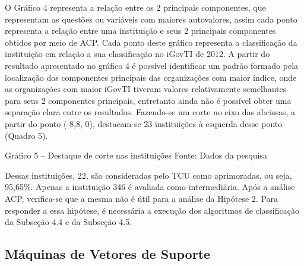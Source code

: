 O Gráfico 4 representa a relação entre os 2 principais componentes, que representam as questões ou variáveis com maiores autovalores, assim cada ponto representa a relação entre uma instituição e seus 2 principais componentes obtidos por meio de ACP. Cada ponto deste gráfico representa a classificação da instituição em relação a sua classificação no iGovTI de 2012. A partir do resultado apresentado no gráfico 4 é possível identificar um padrão formado pela localização dos componentes principais das organizações com maior índice, onde as organizações com maior iGovTI tiveram valores relativamente semelhantes para seus 2 componentes principais, entretanto ainda não é possível obter uma separação clara entre os resultados. Fazendo-se um corte no eixo das abcissas, a partir do ponto (-8,8, 0), destacam-se 23 instituições à esquerda desse ponto (Quadro 5). 

Gráfico 5 – Destaque de corte nas instituições 
Fonte: Dados da pesquisa

Dessas instituições, 22, são consideradas pelo TCU como aprimoradas, ou seja, 95,65\%. Apenas a instituição 346 é avaliada como intermediária.
Após a análise ACP, verifica-se que a mesma não é útil para a análise da Hipótese 2. Para responder a essa hipótese, é necessária a execução dos algoritmos de classificação da Subseção 4.4 e da Subseção 4.5.

\subsection{Máquinas de Vetores de Suporte}

